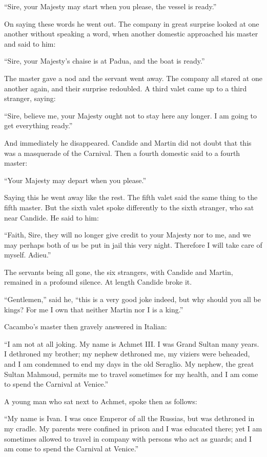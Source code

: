 ``Sire, your Majesty may start when you please, the vessel is ready.''

On saying these words he went out. The company in great surprise looked at one another without speaking a word, when another domestic approached his master and said to him:

``Sire, your Majesty's chaise is at Padua, and the boat is ready.''

The master gave a nod and the servant went away. The company all stared at one another again, and their surprise redoubled. A third valet came up to a third stranger, saying:

``Sire, believe me, your Majesty ought not to stay here any longer. I am going to get everything ready.''

And immediately he disappeared. Candide and Martin did not doubt that this was a masquerade of the Carnival. Then a fourth domestic said to a fourth master:

``Your Majesty may depart when you please.''

Saying this he went away like the rest. The fifth valet said the same thing to the fifth master. But the sixth valet spoke differently to the sixth stranger, who sat near Candide. He said to him:

``Faith, Sire, they will no longer give credit to your Majesty nor to me, and we may perhaps both of us be put in jail this very night. Therefore I will take care of myself. Adieu.''

The servants being all gone, the six strangers, with Candide and Martin, remained in a profound silence. At length Candide broke it.

``Gentlemen,'' said he, ``this is a very good joke indeed, but why should you all be kings? For me I own that neither Martin nor I is a king.''

Cacambo's master then gravely answered in Italian:

``I am not at all joking. My name is Achmet III. I was Grand Sultan many years. I dethroned my brother; my nephew dethroned me, my viziers were beheaded, and I am condemned to end my days in the old Seraglio. My nephew, the great Sultan Mahmoud, permits me to travel sometimes for my health, and I am come to spend the Carnival at Venice.''

A young man who sat next to Achmet, spoke then as follows:

``My name is Ivan. I was once Emperor of all the Russias, but was dethroned in my cradle. My parents were confined in prison and I was educated there; yet I am sometimes allowed to travel in company with persons who act as guards; and I am come to spend the Carnival at Venice.''

